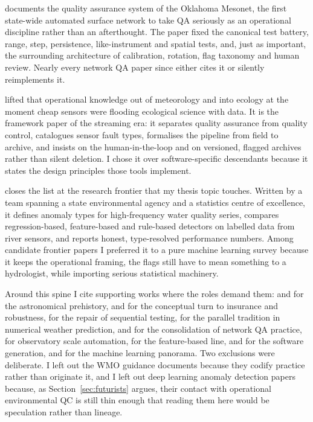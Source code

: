 \citet{shafer2000} documents the quality assurance system of the Oklahoma
Mesonet, the first state-wide automated surface network to take QA seriously
as an operational discipline rather than an afterthought. The paper fixed the
canonical test battery, range, step, persistence, like-instrument and spatial
tests, and, just as important, the surrounding architecture of calibration,
rotation, flag taxonomy and human review. Nearly every network QA paper since
either cites it or silently reimplements it.

\citet{campbell2013} lifted that operational knowledge out of meteorology and
into ecology at the moment cheap sensors were flooding ecological science
with data. It is the framework paper of the streaming era: it separates
quality assurance from quality control, catalogues sensor fault types,
formalises the pipeline from field to archive, and insists on the
human-in-the-loop and on versioned, flagged archives rather than silent
deletion. I chose it over software-specific descendants because it states the
design principles those tools implement.

\citet{leigh2019} closes the list at the research frontier that my thesis
topic touches. Written by a team spanning a state environmental agency and a
statistics centre of excellence, it defines anomaly types for high-frequency
water quality series, compares regression-based, feature-based and rule-based
detectors on labelled data from river sensors, and reports honest,
type-resolved performance numbers. Among candidate frontier papers I
preferred it to a pure machine learning survey because it keeps the
operational framing, the flags still have to mean something to a hydrologist,
while importing serious statistical machinery.

Around this spine I cite supporting works where the roles demand them:
\citet{peirce1852} and \citet{chauvenet1863} for the astronomical prehistory,
\citet{anscombe1960} and \citet{hampel1974} for the conceptual turn to
insurance and robustness, \citet{rosner1983} for the repair of sequential
testing, \citet{gandin1988} for the parallel tradition in numerical weather
prediction, \citet{fiebrich2010} and \citet{estevez2011} for the
consolidation of network QA practice, \citet{taylor2013} for observatory
scale automation, \citet{talagala2019} for the feature-based line,
\citet{jones2022} and \citet{schmidt2023} for the software generation, and
\citet{blazquez2021} for the machine learning panorama. Two exclusions were
deliberate. I left out the WMO guidance documents because they codify
practice rather than originate it, and I left out deep learning anomaly
detection papers because, as Section~\ref{sec:futurists} argues, their
contact with operational environmental QC is still thin enough that reading
them here would be speculation rather than lineage.
